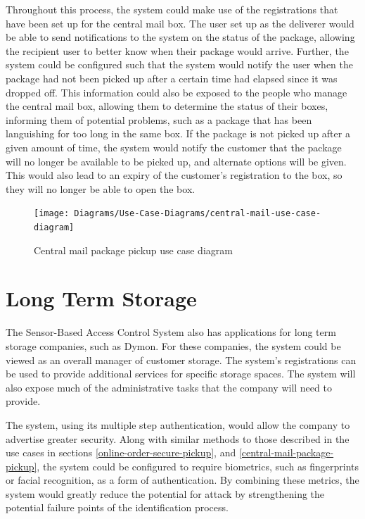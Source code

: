 \documentclass[12pt]{report}
\let\Oldsection\section
\renewcommand{\section}{\FloatBarrier\Oldsection}
\begin{document}
Throughout this process, the system could make use of the registrations that have been set up for the central mail
box. The user set up as the deliverer would be able to send notifications to the system on the status of the package, allowing
the recipient user to better know when their package would arrive. Further, the system could be configured such that the
system would notify the user when the package had not been picked up after a certain time had elapsed since it was
dropped off. This information could also be exposed to the people who manage the central mail box, allowing them to
determine the status of their boxes, informing them of potential problems, such as a package that has been languishing
for too long in the same box. If the package is not picked up after a given amount of time, the system would notify the
customer that the package will no longer be available to be picked up, and alternate options will be given. This would
also lead to an expiry of the customer's registration to the box, so they will no longer be able to open the box.

\begin{figure}
    \texttt{[image: Diagrams/Use-Case-Diagrams/central-mail-use-case-diagram]}
    \caption{Central mail package pickup use case diagram}
    \label{fig:central-mail-use-case-diagram}
\end{figure}


\section{Long Term Storage} \label{long-term-storage}

The Sensor-Based Access Control System also has applications for long term storage companies, such as Dymon. For these 
companies, the system could be viewed as an overall manager of customer storage. The system's registrations can be used 
to provide additional services for specific storage spaces. The system will also expose much of the administrative 
tasks that the company will need to provide.

The system, using its multiple step authentication, would allow the company to advertise greater security. Along with
similar methods to those described in the use cases in sections \ref{online-order-secure-pickup}, and
\ref{central-mail-package-pickup}, the system could be configured to require biometrics, such
as fingerprints or facial recognition, as a form of authentication. By combining these metrics, the system would greatly
reduce the potential for attack by strengthening the potential failure points of the identification process.
\end{document}
